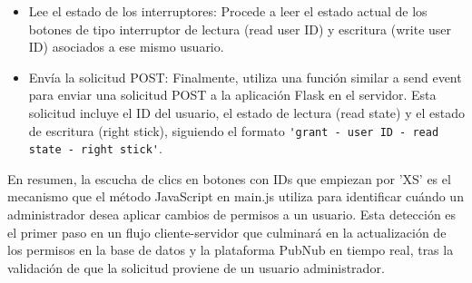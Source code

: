 \documentclass{report}
\begin{document}
\begin{itemize}
\begin{itemize}
\begin{itemize}
                    (el índice 1) como el ID del usuario.
                    \item Lee el estado de los interruptores: Procede a leer el estado actual de los botones de tipo interruptor de lectura 
                    (read user ID) y escritura (write user ID) asociados a ese mismo usuario.
                    \item Envía la solicitud POST: Finalmente, utiliza una función similar a send event para enviar una solicitud POST a la 
                    aplicación Flask en el servidor. Esta solicitud incluye el ID del usuario, el estado de lectura (read state) y el estado 
                    de escritura (right stick), siguiendo el formato \verb|'grant - user ID - read state - right stick'|.                            
                \end{itemize}
        \end{itemize}
\end{itemize}
En resumen, la escucha de clics en botones con IDs que empiezan por 'XS' es el mecanismo que el método JavaScript en main.js utiliza 
para identificar cuándo un administrador desea aplicar cambios de permisos a un usuario. Esta detección es el primer paso en un flujo 
cliente-servidor que culminará en la actualización de los permisos en la base de datos y la plataforma PubNub en tiempo real, tras la 
validación de que la solicitud proviene de un usuario administrador.
\end{document}
